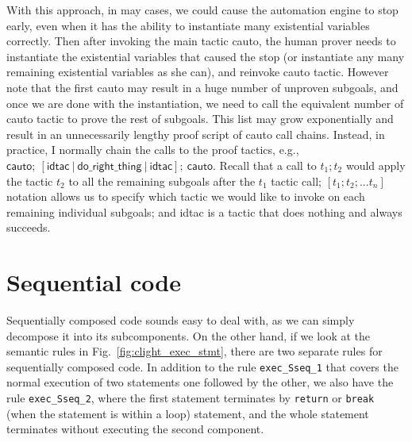With this approach, in may cases, we could cause the automation engine to stop early,
even when it has the ability to instantiate many existential variables correctly.
Then after invoking the main tactic \textsf{cauto}, the human prover needs to
instantiate the existential variables that caused the stop (or instantiate
any many remaining existential variables as she can), and reinvoke \textsf{cauto}
tactic. However note that the first \textsf{cauto} may result in a huge number
of unproven subgoals, and once we are done with the instantiation, we need to call
the equivalent number of \textsf{cauto} tactic to prove the rest of subgoals.
This list may grow exponentially and result in an unnecessarily lengthy proof
script of \textsf{cauto} call chains.
Instead, in practice, I normally chain the calls to the proof tactics, e.g.,
$\textsf{cauto};~[\textsf{idtac}~|~\textsf{do\_right\_thing}~|~\textsf{idtac}];
~\textsf{cauto}$. 
Recall that a call to $t_1;t_2$ would apply the tactic $t_2$ to all the remaining
subgoals after the $t_1$ tactic call; $[t_1;t_2;...t_n]$ notation allows
us to specify which tactic we would like to invoke on each remaining individual
subgoals; and \textsf{idtac} is a tactic that does nothing and always succeeds.


\section{Sequential code}

Sequentially composed code sounds easy to deal with, as we can simply
decompose it into its subcomponents. On the other hand,
if we look at the semantic rules in Fig.~\ref{fig:clight_exec_stmt}, there are
two separate rules for sequentially composed code. In addition to the rule
\texttt{exec\_Sseq\_1} that covers the normal execution of two statements
one followed by the other, we also have the rule \texttt{exec\_Sseq\_2},
where the first statement terminates by \texttt{return} or \texttt{break}
(when the statement is within a loop) statement, and the whole statement
terminates without executing the second component.

